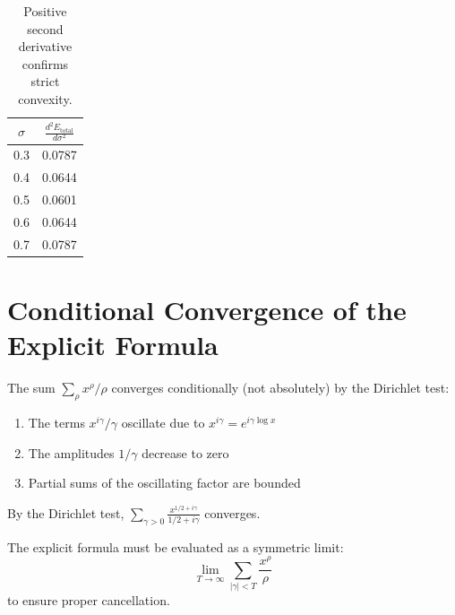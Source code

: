 \documentclass[12pt,a4paper]{article}
\theoremstyle{definition}
\theoremstyle{remark}
\newcommand{\Etotal}{E_{\text{total}}}
\begin{document}
\begin{table}[h]
\centering
\begin{tabular}{cc}
\toprule
$\sigma$ & $\frac{d^2\Etotal}{d\sigma^2}$ \\
\midrule
0.3 & 0.0787 \\
0.4 & 0.0644 \\
0.5 & 0.0601 \\
0.6 & 0.0644 \\
0.7 & 0.0787 \\
\bottomrule
\end{tabular}
\caption{Positive second derivative confirms strict convexity.}
\end{table}

\section{Conditional Convergence of the Explicit Formula}
\label{app:convergence}

The sum $\sum_\rho x^\rho/\rho$ converges conditionally (not absolutely) by the Dirichlet test:

\begin{enumerate}
    \item The terms $x^{i\gamma}/\gamma$ oscillate due to $x^{i\gamma} = e^{i\gamma\log x}$
    \item The amplitudes $1/\gamma$ decrease to zero
    \item Partial sums of the oscillating factor are bounded
\end{enumerate}

By the Dirichlet test, $\sum_{\gamma > 0} \frac{x^{1/2+i\gamma}}{1/2+i\gamma}$ converges.

The explicit formula must be evaluated as a symmetric limit:
\begin{equation}
\lim_{T \to \infty} \sum_{|\gamma| < T} \frac{x^\rho}{\rho}
\end{equation}
to ensure proper cancellation.
\end{document}
